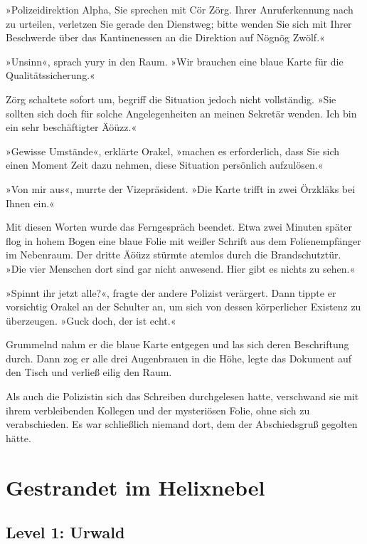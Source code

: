 »Polizeidirektion Alpha, Sie sprechen mit Cör Zörg. Ihrer Anruferkennung nach zu urteilen, verletzen Sie gerade den Dienstweg; bitte wenden Sie sich mit Ihrer Beschwerde über das Kantinenessen an die Direktion auf Nögnög Zwölf.«

»Unsinn«, sprach yury in den Raum. »Wir brauchen eine blaue Karte für die Qualitätssicherung.«

Zörg schaltete sofort um, begriff die Situation jedoch nicht vollständig. »Sie sollten sich doch für solche Angelegenheiten an meinen Sekretär wenden. Ich bin ein sehr beschäftigter Äöüzz.«

»Gewisse Umstände«, erklärte Orakel, »machen es erforderlich, dass Sie sich einen Moment Zeit dazu nehmen, diese Situation persönlich aufzulösen.«

»Von mir aus«, murrte der Vizepräsident. »Die Karte trifft in zwei Örzkläks bei Ihnen ein.«

Mit diesen Worten wurde das Ferngespräch beendet. Etwa zwei Minuten später flog in hohem Bogen eine blaue Folie mit weißer Schrift aus dem Folienempfänger im Nebenraum. Der dritte Äöüzz stürmte atemlos durch die Brandschutztür. »Die vier Menschen dort sind gar nicht anwesend. Hier gibt es nichts zu sehen.«

»Spinnt ihr jetzt alle?«, fragte der andere Polizist verärgert. Dann tippte er vorsichtig Orakel an der Schulter an, um sich von dessen körperlicher Existenz zu überzeugen. »Guck doch, der ist echt.«

Grummelnd nahm er die blaue Karte entgegen und las sich deren Beschriftung durch. Dann zog er alle drei Augenbrauen in die Höhe, legte das Dokument auf den Tisch und verließ eilig den Raum.

Als auch die Polizistin sich das Schreiben durchgelesen hatte, verschwand sie mit ihrem verbleibenden Kollegen und der mysteriösen Folie, ohne sich zu verabschieden. Es war schließlich niemand dort, dem der Abschiedsgruß gegolten hätte.

\cleardoubleevenpage



\chapter{Gestrandet im Helixnebel}

\section{Level 1: Urwald}

